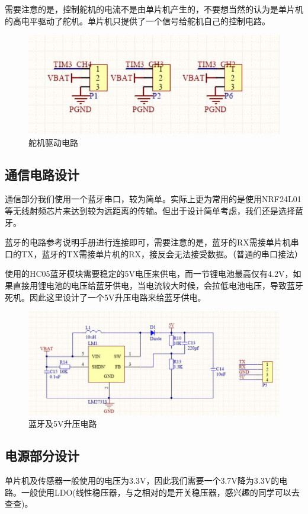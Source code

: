 \documentclass{article}
\begin{document}
需要注意的是，控制舵机的电流不是由单片机产生的，不要想当然的认为是单片机的高电平驱动了舵机。单片机只提供了一个信号给舵机自己的控制电路。

\begin{figure}[htb]
	\centering
	\includegraphics[scale=0.4]{舵机驱动电路.jpg}
	\caption{舵机驱动电路}
	\label{fig:label}
\end{figure}

\subsection{通信电路设计}
通信部分我们使用一个蓝牙串口，较为简单。实际上更为常用的是使用NRF24L01等无线射频芯片来达到较为远距离的传输。但出于设计简单考虑，我们还是选择蓝牙。

蓝牙的电路参考说明手册进行连接即可，需要注意的是，蓝牙的RX需接单片机串口的TX，蓝牙的TX需接单片机的RX，接反会无法接受数据。（普通的串口接法）

使用的HC05蓝牙模块需要稳定的5V电压来供电，而一节锂电池最高仅有4.2V，如果直接用锂电池的电压给蓝牙供电，当电流较大时候，会拉低电池电压，导致蓝牙死机。因此这里设计了一个5V升压电路来给蓝牙供电。

\begin{figure}[htb]
	\centering
	\includegraphics[scale=0.4]{蓝牙电路.jpg}
	\caption{蓝牙及5V升压电路}
	\label{fig:label}
\end{figure}

\subsection{电源部分设计}
单片机及传感器一般使用的电压为3.3V，因此我们需要一个3.7V降为3.3V的电路。一般使用LDO(线性稳压器，与之相对的是开关稳压器，感兴趣的同学可以去查查)。
\end{document}
